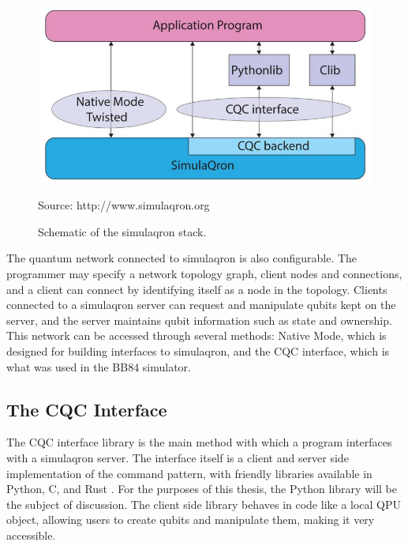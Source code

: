 \begin{figure}[htp]
\centering
\includegraphics[scale=0.30]{images/CQC_schematic.jpg}
\caption{Schematic of the simulaqron stack.}
Source: http://www.simulaqron.org
\label{}
\end{figure}

The quantum network connected to simulaqron is also configurable. 
The programmer may specify a network topology graph, client nodes and connections, and a client can connect by identifying itself as a node in the topology.
Clients connected to a simulaqron server can request and manipulate qubits kept on the server, and the server maintains qubit information such as state and ownership.
This network can be accessed through several methods: Native Mode, which is designed for building interfaces to simulaqron, and the CQC interface, which is what was used in the BB84 simulator.

\subsection{The CQC Interface}
The CQC interface library is the main method with which a program interfaces with a simulaqron server.
The interface itself is a client and server side implementation of the command pattern, with friendly libraries available in Python, C, and Rust \cite{simulaqron}.
For the purposes of this thesis, the Python library will be the subject of discussion.
The client side library behaves in code like a local QPU object, allowing users to create qubits and manipulate them, making it very accessible.

